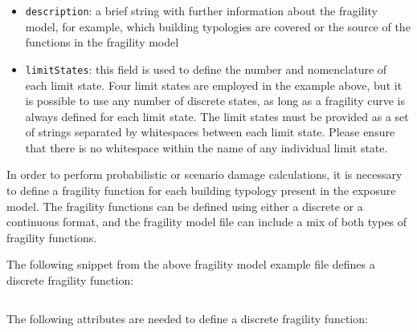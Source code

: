 \begin{itemize}

    \item \Verb+description+: a brief string with further information about the
    \gls{fragility model}, for example, which building typologies are covered or 
    the source of the functions in the \gls{fragility model}

    \item \Verb+limitStates+: this field is used to define the number and 
    nomenclature of each limit state. Four limit states are employed in the 
    example above, but it is possible to use any number of discrete states,
    as long as a fragility curve is always defined for each limit state. The 
    limit states must be provided as a set of strings separated by whitespaces 
    between each limit state. Please ensure that there is no whitespace within 
    the name of any individual limit state.

\end{itemize}

In order to perform probabilistic or scenario damage calculations, it is
necessary to define a \gls{fragility function} for each building typology present in
the exposure model. The \glspl{fragility function} can be defined using either a
discrete or a continuous format, and the \gls{fragility model} file can include a
mix of both types of \glspl{fragility function}.

The following snippet from the above fragility model example file defines a
discrete fragility function:

\inputminted[firstline=11,firstnumber=11,lastline=17,fontsize=\footnotesize,frame=single,linenos,bgcolor=lightgray]{xml}{oqum/risk/Verbatim/input_fragility.xml}

The following attributes are needed to define a discrete \gls{fragility function}:

